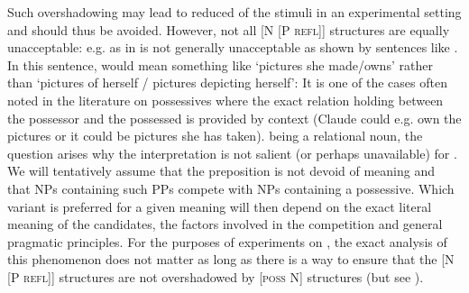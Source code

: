 \documentclass[output=paper,colorlinks,citecolor=brown]{langscibook}
\begin{document}
Such overshadowing may lead to reduced  of the stimuli in an experimental setting and should thus be avoided.
However, not all [N [P \textsc{refl}]] structures are equally unacceptable: e.g.  as in  is not generally unacceptable as shown by sentences like  \parencite[156]{kiss_reflexivity_2012}.
In this sentence,  would mean something like `pictures she made/owns' rather than `pictures of herself / pictures depicting herself':
It is one of the cases often noted in the literature on possessives \parencite[see e.g.][]{barker2019} where the exact relation holding between the possessor and the possessed is provided by context (Claude could e.g. own the pictures or it could be pictures she has taken).
 being a relational noun, the question arises why the interpretation  is not salient (or perhaps unavailable) for .
We will tentatively assume that the preposition  is not devoid of meaning and that NPs containing such PPs compete with NPs containing a possessive.
Which variant is preferred for a given meaning will then depend on the exact literal meaning of the candidates, the factors involved in the competition and general pragmatic principles.
For the purposes of experiments on  , the exact analysis of this phenomenon does not matter as long as there is a way to ensure that the [N [P \textsc{refl}]] structures are not overshadowed by [\textsc{poss} N] structures (but see ).

\end{document}
